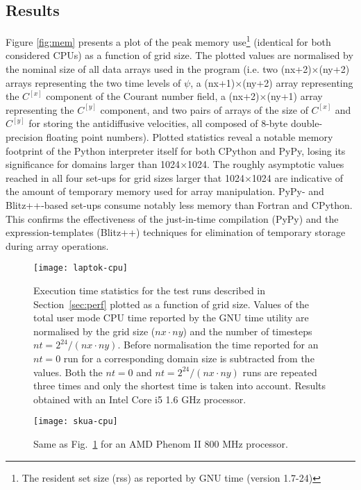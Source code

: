 \documentclass[twocolumn]{article}
\begin{document}
  \subsection{Results}

  Figure \ref{fig:mem} presents a plot of the peak memory use\footnote{The resident set size (rss)
    as reported by GNU time (version 1.7-24)} (identical for both considered CPUs)
    as a function of grid size.
  The plotted values are normalised by the nominal size of all data arrays used in the program
    (i.e. two (nx+2)$\times$(ny+2) arrays representing the two time levels of $\psi$, 
     a (nx+1)$\times$(ny+2) array representing the $C^{[x]}$ component of the Courant number field,
     a (nx+2)$\times$(ny+1) array representing the $C^{[y]}$ component, 
     and two pairs of arrays of the size of $C^{[x]}$ and $C^{[y]}$ for storing the 
     antidiffusive velocities, all composed of 8-byte double-precision floating point numbers).
  Plotted statistics reveal a notable memory footprint of the Python interpreter itself
    for both CPython and PyPy, losing its significance for domains larger than 1024$\times$1024.
  The roughly asymptotic values reached in all four set-ups for grid sizes larger that 1024$\times$1024
    are indicative of the amount of temporary memory used for array manipulation.
  PyPy- and Blitz++-based set-ups consume notably less memory than Fortran and CPython.
  This confirms the effectiveness of the just-in-time compilation (PyPy) and the expression-templates (Blitz++) techniques
    for elimination of temporary storage during array operations.

  \begin{figure}[h!]
    \center
    \texttt{[image: laptok-cpu]}
    \caption{\label{fig:cpu-eyrie}
      Execution time statistics for the test runs described in Section~\ref{sec:perf}
        plotted as a function of grid size.
      Values of the total user mode CPU time reported by the GNU time utility are
        normalised by the grid size ($nx \cdot ny$) and the number of timesteps $nt=2^{24}/(nx \cdot ny)$.
      Before normalisation the time reported for an $nt=0$ run for a corresponding
        domain size is subtracted from the values.
      Both the $nt=0$ and $nt=2^{24}/(nx \cdot ny)$ runs are repeated three times and
        only the shortest time is taken into account.
      Results obtained with an Intel\textsuperscript{\textregistered} 
        Core\textsuperscript{\texttrademark} i5 1.6 GHz processor.
    }
  \end{figure}
  \begin{figure}[th!]
    \center
    \texttt{[image: skua-cpu]}
    \caption{\label{fig:cpu-skua}
      Same as Fig.~\ref{fig:cpu-eyrie} for an AMD Phenom\textsuperscript{\texttrademark} II 800 MHz processor.
    }
  \end{figure}
\end{document}
